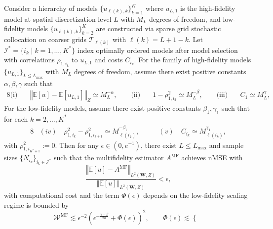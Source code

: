 %
\begin{theorem}\label{thm:Sample_cost_est}
Consider a hierarchy of models $\{u_{\ell(k),k}\}_{k=1}^{K}$ where $u_{L,1}$ is the high-fidelity model at spatial discretization level $L$ with $M_L$ degrees of freedom, and low-fidelity models $\{u_{\ell(k),k}\}_{k=2}^K$ are constructed via sparse grid stochastic collocation on coarser grids $\mathcal{T}_{\ell(k)}$ with $\ell(k) = L + 1 - k$. Let $\mathcal{I}^* = \{i_k \mid k = 1, \dots, K^*\}$ index optimally ordered models after model selection with correlations $\rho_{1,i_k}$ to $u_{L,1}$ and costs $C_{i_k}$. For the family of high-fidelity models $\{u_{L,1}\}_{L\le L_{\max}}$ with $M_L$ degrees of freedom, assume  there exist positive constants $\alpha, \beta, \gamma$ such that
%
\begin{alignat*}{8}
    \text{(i)}\quad & \left\Vert \mathbb{E}[u] - \mathbb{E}[u_{L,1}] \right\Vert_Z \simeq M_L^{-\alpha}, \qquad
    \text{(ii)}\quad & 1 - \rho_{1,i_2}^2 \simeq M_L^{-\beta}, \qquad
    \text{(iii)}\quad & C_1 \simeq M_L^{\gamma},
\end{alignat*}
%
For the low-fidelity models, assume there exist positive constants $\beta_1, \gamma_1$ such that for each $k=2,\dots,K^*$
%
\begin{alignat*}{8}
    &(iv)\quad \rho_{1,i_k}^2-\rho_{1,i_{k+1}}^2 \simeq M_{\ell(i_k)}^{-\beta_1},
    \qquad
&(v)\quad C_{i_k} \simeq M_{\ell(i_k)}^{\gamma_1},
\end{alignat*}
%
with $\rho_{1,i_{K^*+1}}^2 := 0$. Then for any $\epsilon \in (0,e^{-1})$, there exist $L \leq L_{\max}$ and sample sizes $\{N_{i_k}\}_{i_k\in \mathcal{I}^*}$ such that the multifidelity estimator $A^{\mathrm{MF}}$ achieves nMSE  with
%
\[
\frac{\left\Vert \mathbb{E}[u] - A^{\mathrm{MF}} \right\Vert_{L^2(\boldsymbol{W},Z)}}{\left\Vert \mathbb{E}[u] \right\Vert_{L^2(\boldsymbol{W},Z)}} < \epsilon,
\]
%
with computational cost and the term $\Phi(\epsilon)$ depends on the low-fidelity scaling regime is bounded by
%
\begin{equation}\label{eq:lfm_scaling}
\mathcal{W}^{\mathrm{MF}} \lesssim \epsilon^{-2} \left( \epsilon^{-\frac{\gamma-\beta}{2\alpha}} + \Phi(\epsilon) \right)^2,\qquad 
\Phi(\epsilon) \lesssim \begin{cases} 

\end{cases}
\end{equation}
\end{theorem}

